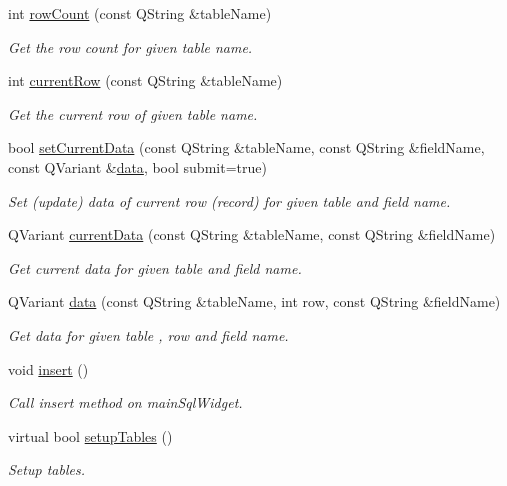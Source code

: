 \begin{DoxyCompactItemize}
int \hyperlink{classmdt_sql_form_a7d50c271fc506764ed20dd88914d0ddc}{row\-Count} (const Q\-String \&table\-Name)
\begin{DoxyCompactList}\small\item\em Get the row count for given table name. \end{DoxyCompactList}\item 
int \hyperlink{classmdt_sql_form_a855de08e9ddb3f7898ef4ceb0b0331f9}{current\-Row} (const Q\-String \&table\-Name)
\begin{DoxyCompactList}\small\item\em Get the current row of given table name. \end{DoxyCompactList}\item 
bool \hyperlink{classmdt_sql_form_aa377e70f4a2e865b0b696957c0fca766}{set\-Current\-Data} (const Q\-String \&table\-Name, const Q\-String \&field\-Name, const Q\-Variant \&\hyperlink{classmdt_sql_form_a0c27d6a9ecbf0589f313c7193c632a62}{data}, bool submit=true)
\begin{DoxyCompactList}\small\item\em Set (update) data of current row (record) for given table and field name. \end{DoxyCompactList}\item 
Q\-Variant \hyperlink{classmdt_sql_form_aca283557b7e2586779cb5c498d388f14}{current\-Data} (const Q\-String \&table\-Name, const Q\-String \&field\-Name)
\begin{DoxyCompactList}\small\item\em Get current data for given table and field name. \end{DoxyCompactList}\item 
Q\-Variant \hyperlink{classmdt_sql_form_a0c27d6a9ecbf0589f313c7193c632a62}{data} (const Q\-String \&table\-Name, int row, const Q\-String \&field\-Name)
\begin{DoxyCompactList}\small\item\em Get data for given table , row and field name. \end{DoxyCompactList}\item 
void \hyperlink{classmdt_sql_form_a2138e4e1236a9b1c002825ddd9e59298}{insert} ()
\begin{DoxyCompactList}\small\item\em Call insert method on main\-Sql\-Widget. \end{DoxyCompactList}\item 
virtual bool \hyperlink{classmdt_sql_form_a27fe6e45aa5d4d7782aad9833e6de20b}{setup\-Tables} ()
\begin{DoxyCompactList}\small\item\em Setup tables. \end{DoxyCompactList}\end{DoxyCompactItemize}
